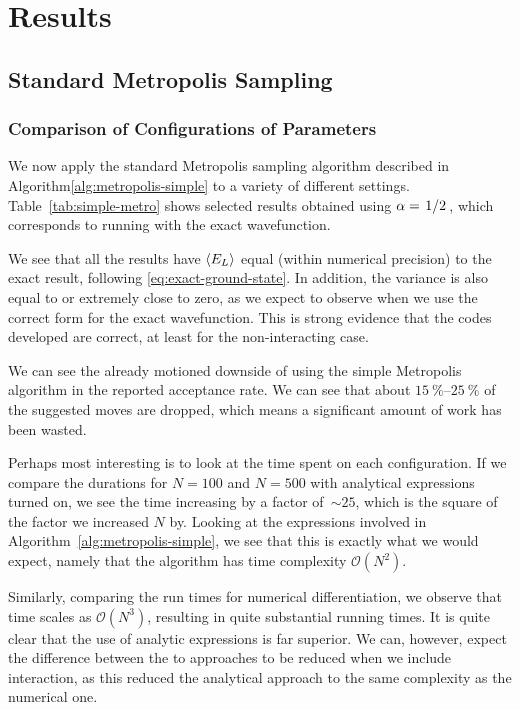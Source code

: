 \documentclass[twocolumn]{article}
\begin{document}
\section{Results}

\subsection{Standard Metropolis Sampling}

\subsubsection{Comparison of Configurations of Parameters}

We now apply the standard Metropolis sampling algorithm described in 
Algorithm\ref{alg:metropolis-simple} to a variety of different settings.
Table~\ref{tab:simple-metro} shows selected results obtained using
$\alpha=\flatfrac{1}{2}$, which corresponds to running with the exact
wavefunction. 

We see that all the results have $\expval{E_L}$
equal (within numerical precision) to the exact result, following
\eqref{eq:exact-ground-state}. In addition, the variance is also equal to
or extremely close to zero, as we expect to observe when we use the correct form
for the exact wavefunction. This is strong evidence that the codes developed are
correct, at least for the non-interacting case.

We can see the already motioned downside of using the simple Metropolis
algorithm in the reported acceptance rate. We can see that about
$\SIrange{15}{25}{\percent}$ of the suggested moves are dropped, which means a
significant amount of work has been wasted.

Perhaps most interesting is to look at the time spent on each configuration. If
we compare the durations for $N=100$ and $N=500$ with analytical expressions
turned on, we see the time increasing by a factor of~$\sim 25$, which is the
square of the factor we increased $N$ by. Looking at the expressions involved in
Algorithm~\ref{alg:metropolis-simple}, we see that this is exactly what we would
expect, namely that the algorithm has time complexity $\mathcal{O}(N^2)$.

Similarly, comparing the run times for numerical differentiation, we observe
that time scales as $\mathcal{O}(N^3)$, resulting in quite substantial running
times. It is quite clear that the use of analytic expressions is far superior.
We can, however, expect the difference between the to approaches to be reduced when we include
interaction, as this reduced the analytical approach to the same complexity as
the numerical one.
\end{document}
